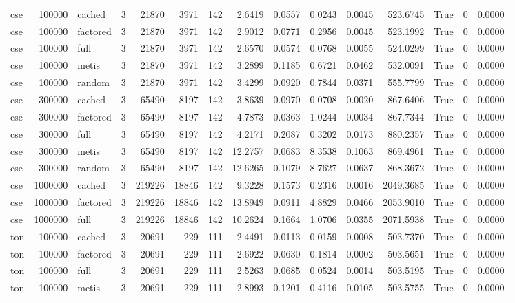 \begin{tabular}{lrlrrrrrrrrrrrr}
cse & 100000 & cached & 3 & 21870 & 3971 & 142 & 2.6419 & 0.0557 & 0.0243 & 0.0045 & 523.6745 & True & 0 & 0.0000 \\
cse & 100000 & factored & 3 & 21870 & 3971 & 142 & 2.9012 & 0.0771 & 0.2956 & 0.0045 & 523.1992 & True & 0 & 0.0000 \\
cse & 100000 & full & 3 & 21870 & 3971 & 142 & 2.6570 & 0.0574 & 0.0768 & 0.0055 & 524.0299 & True & 0 & 0.0000 \\
cse & 100000 & metis & 3 & 21870 & 3971 & 142 & 3.2899 & 0.1185 & 0.6721 & 0.0462 & 532.0091 & True & 0 & 0.0000 \\
cse & 100000 & random & 3 & 21870 & 3971 & 142 & 3.4299 & 0.0920 & 0.7844 & 0.0371 & 555.7799 & True & 0 & 0.0000 \\
cse & 300000 & cached & 3 & 65490 & 8197 & 142 & 3.8639 & 0.0970 & 0.0708 & 0.0020 & 867.6406 & True & 0 & 0.0000 \\
cse & 300000 & factored & 3 & 65490 & 8197 & 142 & 4.7873 & 0.0363 & 1.0244 & 0.0034 & 867.7344 & True & 0 & 0.0000 \\
cse & 300000 & full & 3 & 65490 & 8197 & 142 & 4.2171 & 0.2087 & 0.3202 & 0.0173 & 880.2357 & True & 0 & 0.0000 \\
cse & 300000 & metis & 3 & 65490 & 8197 & 142 & 12.2757 & 0.0683 & 8.3538 & 0.1063 & 869.4961 & True & 0 & 0.0000 \\
cse & 300000 & random & 3 & 65490 & 8197 & 142 & 12.6265 & 0.1079 & 8.7627 & 0.0637 & 868.3672 & True & 0 & 0.0000 \\
cse & 1000000 & cached & 3 & 219226 & 18846 & 142 & 9.3228 & 0.1573 & 0.2316 & 0.0016 & 2049.3685 & True & 0 & 0.0000 \\
cse & 1000000 & factored & 3 & 219226 & 18846 & 142 & 13.8949 & 0.0911 & 4.8829 & 0.0466 & 2053.9010 & True & 0 & 0.0000 \\
cse & 1000000 & full & 3 & 219226 & 18846 & 142 & 10.2624 & 0.1664 & 1.0706 & 0.0355 & 2071.5938 & True & 0 & 0.0000 \\
ton & 100000 & cached & 3 & 20691 & 229 & 111 & 2.4491 & 0.0113 & 0.0159 & 0.0008 & 503.7370 & True & 0 & 0.0000 \\
ton & 100000 & factored & 3 & 20691 & 229 & 111 & 2.6922 & 0.0630 & 0.1814 & 0.0002 & 503.5651 & True & 0 & 0.0000 \\
ton & 100000 & full & 3 & 20691 & 229 & 111 & 2.5263 & 0.0685 & 0.0524 & 0.0014 & 503.5195 & True & 0 & 0.0000 \\
ton & 100000 & metis & 3 & 20691 & 229 & 111 & 2.8993 & 0.1201 & 0.4116 & 0.0105 & 503.5755 & True & 0 & 0.0000 \\

\end{tabular}
